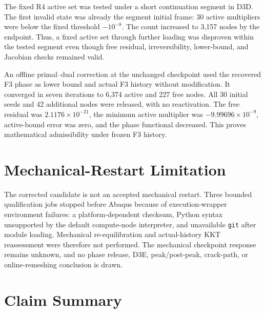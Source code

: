 The fixed R4 active set was tested under a short continuation segment in D3D.
The first invalid state was already the segment initial frame: 30 active
multipliers were below the fixed threshold \(-10^{-8}\).  The count increased
to 3,157 nodes by the endpoint.  Thus, a fixed active set through further
loading was disproven within the tested segment even though free residual,
irreversibility, lower-bound, and Jacobian checks remained valid.

An offline primal--dual correction at the unchanged checkpoint used the
recovered F3 phase as lower bound and actual F3 history without modification.
It converged in seven iterations to 6,374 active and 227 free nodes.  All 30
initial seeds and 42 additional nodes were released, with no reactivation.
The free residual was \(2.1176\times10^{-21}\), the minimum active multiplier
was \(-9.99696\times10^{-9}\), active-bound error was zero, and the phase
functional decreased.  This proves mathematical admissibility under frozen F3
history.

\section{Mechanical-Restart Limitation}

The corrected candidate is not an accepted mechanical restart.  Three bounded
qualification jobs stopped before Abaqus because of execution-wrapper
environment failures: a platform-dependent checksum, Python syntax unsupported
by the default compute-node interpreter, and unavailable \texttt{git} after
module loading.  Mechanical re-equilibration and actual-history KKT
reassessment were therefore not performed.  The mechanical checkpoint
response remains unknown, and no phase release, D3E, peak/post-peak, crack-path,
or online-remeshing conclusion is drawn.

\section{Claim Summary}

